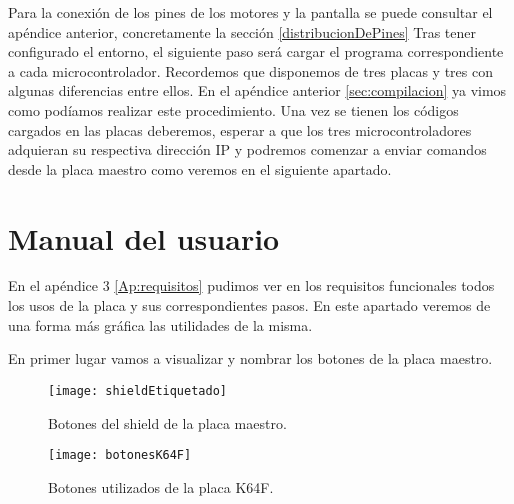 Para la conexión de los pines de los motores y la pantalla se puede consultar el apéndice anterior, concretamente la sección \ref{distribucionDePines}
Tras tener configurado el entorno, el siguiente paso será cargar el programa correspondiente a cada microcontrolador. Recordemos que disponemos de tres placas y tres  con algunas diferencias entre ellos. En el apéndice anterior \ref{sec:compilacion} ya vimos como podíamos realizar este procedimiento.
Una vez se tienen los códigos cargados en las placas deberemos, esperar a que los tres microcontroladores adquieran su respectiva dirección IP y podremos comenzar a enviar comandos desde la placa maestro como veremos en el siguiente apartado.

\section{Manual del usuario}
En el apéndice 3 \ref{Ap:requisitos} pudimos ver en los requisitos funcionales todos los usos de la placa y sus correspondientes pasos. En este apartado veremos de una forma más gráfica las utilidades de la misma.

En primer lugar vamos a visualizar y nombrar los botones de la placa maestro.

\begin{figure}[!h]
	\centering
	\texttt{[image: shieldEtiquetado]}
	\caption{Botones del shield de la placa maestro.}
\end{figure}
\FloatBarrier

\begin{figure}[!h]
	\centering
	\texttt{[image: botonesK64F]}
	\caption{Botones utilizados de la placa K64F.}
\end{figure}
\FloatBarrier

